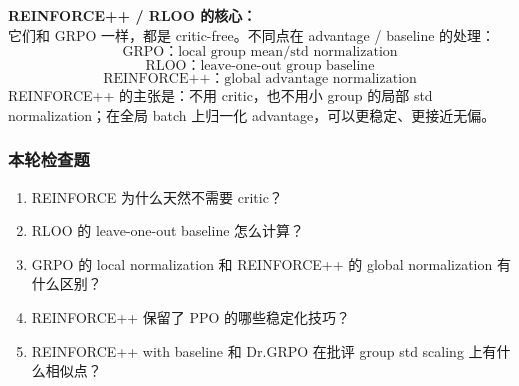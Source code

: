 \begin{summarybox}
\textbf{REINFORCE++ / RLOO 的核心：}\\
它们和 GRPO 一样，都是 critic-free。不同点在 advantage / baseline 的处理：
\[
\text{GRPO：local group mean/std normalization}
\]
\[
\text{RLOO：leave-one-out group baseline}
\]
\[
\text{REINFORCE++：global advantage normalization}
\]
REINFORCE++ 的主张是：不用 critic，也不用小 group 的局部 std normalization；在全局 batch 上归一化 advantage，可以更稳定、更接近无偏。
\end{summarybox}

\subsubsection{本轮检查题}

\begin{enumerate}[leftmargin=1.5em]
  \item REINFORCE 为什么天然不需要 critic？
  \item RLOO 的 leave-one-out baseline 怎么计算？
  \item GRPO 的 local normalization 和 REINFORCE++ 的 global normalization 有什么区别？
  \item REINFORCE++ 保留了 PPO 的哪些稳定化技巧？
  \item REINFORCE++ with baseline 和 Dr.GRPO 在批评 group std scaling 上有什么相似点？
\end{enumerate}
